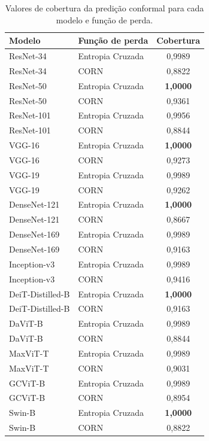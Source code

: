 \begin{table}[!htbp]
    \centering
    \begin{tabular}{|l|l|c|}
        \hline
        \textbf{Modelo} & \textbf{Função de perda} & \textbf{Cobertura} \\
        \hline
        ResNet-34 & Entropia Cruzada &    0,9989 \\
        \hline
        ResNet-34 & CORN &    0,8822 \\
        \hline
        ResNet-50 & Entropia Cruzada &    \textbf{1,0000} \\
        \hline
        ResNet-50 & CORN &    0,9361 \\
        \hline
        ResNet-101 & Entropia Cruzada &    0,9956 \\
        \hline
        ResNet-101 & CORN &    0,8844 \\
        \hline
        VGG-16 & Entropia Cruzada &    \textbf{1,0000} \\
        \hline
        VGG-16 & CORN &    0,9273 \\
        \hline
        VGG-19 & Entropia Cruzada &    0,9989 \\
        \hline
        VGG-19 & CORN &    0,9262 \\
        \hline
        DenseNet-121 & Entropia Cruzada &    \textbf{1,0000} \\
        \hline
        DenseNet-121 & CORN &    0,8667 \\
        \hline
        DenseNet-169 & Entropia Cruzada &    0,9989 \\
        \hline
        DenseNet-169 & CORN &    0,9163 \\
        \hline
        Inception-v3 & Entropia Cruzada &    0,9989 \\
        \hline
        Inception-v3 & CORN &    0,9416 \\
        \hline
        DeiT-Distilled-B & Entropia Cruzada &    \textbf{1,0000} \\
        \hline
        DeiT-Distilled-B & CORN &    0,9163 \\
        \hline
        DaViT-B & Entropia Cruzada &    0,9989 \\
        \hline
        DaViT-B & CORN &    0,8844 \\
        \hline
        MaxViT-T & Entropia Cruzada &    0,9989 \\
        \hline
        MaxViT-T & CORN &    0,9031 \\
        \hline
        GCViT-B & Entropia Cruzada &    0,9989 \\
        \hline
        GCViT-B & CORN &    0,8954 \\
        \hline
        Swin-B & Entropia Cruzada &    \textbf{1,0000} \\
        \hline
        Swin-B & CORN &    0,8822 \\
        \hline
    \end{tabular}
    \caption{Valores de cobertura da predição conformal para cada modelo e função de perda.}
    \label{tab:conformal_coverage}
\end{table}


